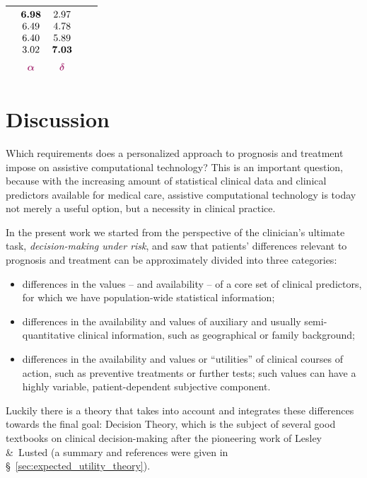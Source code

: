 \documentclass[utf8]{FrontiersinHarvard} %
\newcommand*{\amp}{\&}
\newcommand*{\sect}{\S}%
\renewcommand*{\|}[1][]{\nonscript\:#1\vert\nonscript\:\mathopen{}}
\begin{document}
\begin{table}[t]
\begin{tabular}{lcccc}
    &
    $\begin{matrix}\bm{6.98}\\6.49\\6.40\\3.02\\[2\jot]\color{redpurple}\bm{\alpha}\end{matrix}$
    &
    $\begin{matrix}2.97\\4.78\\5.89\\\bm{7.03}\\[2\jot]\color{redpurple}\bm{\delta}\end{matrix}$
    \\[7\jot]
    \hline
  \end{tabular}
\end{table}



\bigskip%
\section{Discussion}
\label{sec:discussion}

Which requirements does a personalized approach to prognosis and treatment impose on assistive computational technology? This is an important question, because with the increasing amount of statistical clinical data and clinical predictors available for medical care, assistive computational technology is today not merely a useful option, but a necessity in clinical practice.

In the present work we started from the perspective of the clinician's ultimate task, \emph{decision-making under risk}, and saw that patients' differences relevant to prognosis and treatment can be approximately divided into three categories:
\begin{itemize}
\item\label{item:diff_corepredictors} differences in the values -- and availability -- of a core set of clinical predictors, for which we have population-wide statistical information;
\item\label{item:diff_priorinfo} differences in the availability and values of auxiliary and usually semi-quantitative clinical information, such as geographical or family background;
\item\label{item:diff_utility} differences in the availability and values or \enquote{utilities} of clinical courses of action, such as preventive treatments or further tests; such values can have a highly variable, patient-dependent subjective component.
\end{itemize}
Luckily there is a theory that takes into account and integrates these differences towards the final goal: Decision Theory, which is the subject of several good textbooks on clinical decision-making \citep{weinsteinetal1980,soxetal1988_r2013,huninketal2001_r2014} after the pioneering work of Lesley \amp\ Lusted \citeyearpar{ledleyetal1959,ledleyetal1959b,ledleyetal1960,lustedetal1960} (a summary and references were given in \sect~\ref{sec:expected_utility_theory}).
\end{document}
